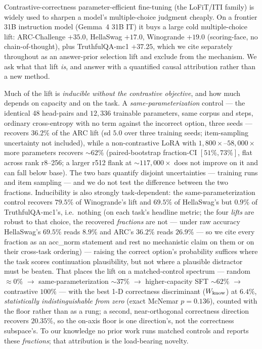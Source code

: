 Contrastive-correctness parameter-efficient fine-tuning (the LoFiT/ITI family) is
widely used to sharpen a model's multiple-choice judgment cheaply. On a frontier 31B
instruction model (Gemma~4 31B IT) it buys a large cold multiple-choice lift:
ARC-Challenge $+35.0$, HellaSwag $+17.0$, Winogrande $+19.0$ (scoring-face, no
chain-of-thought), plus TruthfulQA-mc1 $+37.25$, which we cite separately throughout
as an answer-prior selection lift and exclude from the mechanism. We ask what that
lift \emph{is}, and answer with a quantified causal attribution rather than a new
method.

Much of the lift is \emph{inducible without the contrastive objective}, and how much
depends on capacity and on the task. A \emph{same-parameterization} control --- the
identical 48 head-pairs and $12{,}336$ trainable parameters, same corpus and steps,
ordinary cross-entropy with no term against the incorrect option, three seeds ---
recovers $36.2\%$ of the ARC lift (sd $5.0$ over three training seeds;
item-sampling uncertainty not included), while a non-contrastive LoRA with
$1{,}800\times$--$58{,}000\times$ more parameters recovers ${\sim}62\%$
(paired-bootstrap fraction-CI $[51\%, 73\%]$, flat across rank r8--256; a larger
r512 flank at ${\sim}117{,}000\times$ does not improve on it and can fall below
base). The two bars quantify disjoint uncertainties --- training runs and item
sampling --- and we do not test the difference between the two fractions.
Inducibility is also strongly
task-dependent: the same-parameterization control recovers $79.5\%$ of Winogrande's
lift and $69.5\%$ of HellaSwag's but $0.9\%$ of TruthfulQA-mc1's, i.e.\ nothing (on
each task's headline metric; the four \emph{lifts} are robust to that choice, the
recovered \emph{fractions} are not --- under raw accuracy HellaSwag's $69.5\%$ reads
$8.9\%$ and ARC's $36.2\%$ reads $26.9\%$ --- so we cite every fraction as an
acc\_norm statement and rest no mechanistic claim on them or on their cross-task
ordering) ---
raising the correct option's probability suffices where the task scores continuation
plausibility, but not where a plausible distractor must be beaten. That places the
lift on a matched-control spectrum --- random ${\approx}0\%$ $\rightarrow$
same-parameterization ${\sim}37\%$ $\rightarrow$ higher-capacity SFT ${\sim}62\%$
$\rightarrow$ contrastive $100\%$ --- with the best 1-D correctness discriminant
($W_{\mathrm{know}}$) at $6.4\%$, \emph{statistically indistinguishable from zero} (exact
McNemar $p=0.136$), counted with the floor rather than as a rung; a second,
near-orthogonal correctness direction recovers $20.35\%$, so the on-axis floor is
one direction's, not the correctness subspace's. To our knowledge no prior work runs matched
controls and reports these \emph{fractions}; that attribution is the load-bearing
novelty.

